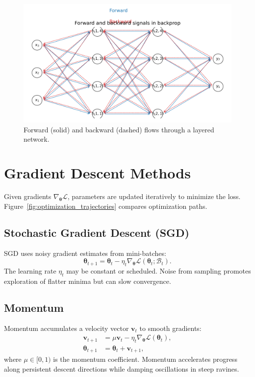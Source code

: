 ﻿\documentclass[12pt]{article}
\begin{document}
\begin{figure}[H]
  \centering
  \includegraphics[width=0.8\linewidth]{backprop_computational_graph.png}
  \caption{Forward (solid) and backward (dashed) flows through a layered network.}
  \label{fig:backprop_graph}
\end{figure}
\FloatBarrier

\section{Gradient Descent Methods}
Given gradients $\nabla_{\boldsymbol{\theta}} \mathcal{L}$, parameters are updated iteratively to minimize the loss. Figure~\ref{fig:optimization_trajectories} compares optimization paths.

\subsection{Stochastic Gradient Descent (SGD)}
SGD uses noisy gradient estimates from mini-batches:
\begin{equation}
  \boldsymbol{\theta}_{t+1} = \boldsymbol{\theta}_t - \eta_t \nabla_{\boldsymbol{\theta}} \mathcal{L}(\boldsymbol{\theta}_t; \mathcal{B}_t).
\end{equation}
The learning rate $\eta_t$ may be constant or scheduled. Noise from sampling promotes exploration of flatter minima but can slow convergence.

\subsection{Momentum}
Momentum accumulates a velocity vector $\mathbf{v}_t$ to smooth gradients:
\begin{align}
  \mathbf{v}_{t+1} &= \mu \mathbf{v}_t - \eta_t \nabla_{\boldsymbol{\theta}} \mathcal{L}(\boldsymbol{\theta}_t), \\
  \boldsymbol{\theta}_{t+1} &= \boldsymbol{\theta}_t + \mathbf{v}_{t+1},
\end{align}
where $\mu \in [0,1)$ is the momentum coefficient. Momentum accelerates progress along persistent descent directions while damping oscillations in steep ravines.
\end{document}
